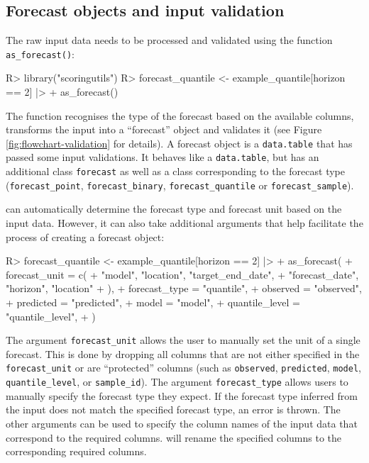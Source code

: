 \documentclass[
]{jss}
\begin{document}
\subsection{Forecast objects and input validation} \label{sec:validation}

The raw input data needs to be processed and validated using the
function \texttt{as\_forecast()}:

\begin{CodeChunk}
\begin{CodeInput}
R> library("scoringutils")
R> forecast_quantile <- example_quantile[horizon == 2] |>
+   as_forecast() 
\end{CodeInput}
\end{CodeChunk}

The function  recognises the type of the forecast
based on the available columns, transforms the input into a ``forecast''
object and validates it (see Figure \ref{fig:flowchart-validation} for
details). A forecast object is a \texttt{data.table} that has passed
some input validations. It behaves like a \texttt{data.table}, but has
an additional class \texttt{forecast} as well as a class corresponding
to the forecast type (\texttt{forecast\_point},
\texttt{forecast\_binary}, \texttt{forecast\_quantile} or
\texttt{forecast\_sample}).

 can automatically determine the forecast type and
forecast unit based on the input data. However, it can also take
additional arguments that help facilitate the process of creating a
forecast object:

\begin{CodeChunk}
\begin{CodeInput}
R> forecast_quantile <- example_quantile[horizon == 2] |>
+   as_forecast(
+     forecast_unit = c(
+       "model", "location", "target_end_date", 
+       "forecast_date", "horizon", "location"
+     ),
+     forecast_type = "quantile",
+     observed = "observed", 
+     predicted = "predicted",
+     model = "model",
+     quantile_level = "quantile_level",
+   ) 
\end{CodeInput}
\end{CodeChunk}

The argument \texttt{forecast\_unit} allows the user to manually set the
unit of a single forecast. This is done by dropping all columns that are
not either specified in the \texttt{forecast\_unit} or are ``protected''
columns (such as \texttt{observed}, \texttt{predicted}, \texttt{model},
\texttt{quantile\_level}, or \texttt{sample\_id}). The argument
\texttt{forecast\_type} allows users to manually specify the forecast
type they expect. If the forecast type inferred from the input does not
match the specified forecast type, an error is thrown. The other
arguments can be used to specify the column names of the input data that
correspond to the required columns.  will rename
the specified columns to the corresponding required columns.
\end{document}
